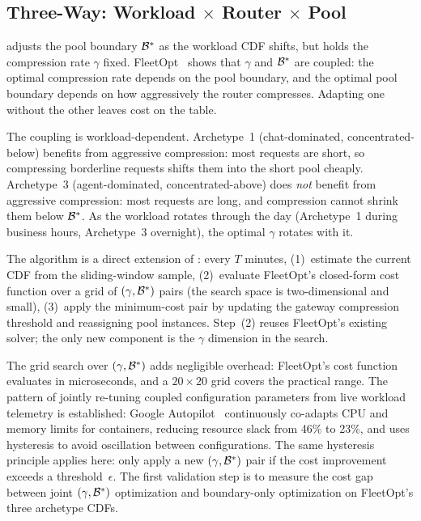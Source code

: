 \subsection{Three-Way: Workload $\times$ Router $\times$ Pool}

\begin{opportunity}
\label{opp:workload-shaping}
 adjusts the pool boundary $\mathcal{B}^*$
as the workload CDF shifts, but holds the compression rate $\gamma$
fixed.  FleetOpt~\cite{fleetopt2026} shows that $\gamma$ and
$\mathcal{B}^*$ are coupled: the optimal compression rate depends on
the pool boundary, and the optimal pool boundary depends on how
aggressively the router compresses.  Adapting one without the other
leaves cost on the table.

The coupling is workload-dependent.  Archetype~1 (chat-dominated,
concentrated-below) benefits from aggressive compression: most
requests are short, so compressing borderline requests shifts them
into the short pool cheaply.  Archetype~3 (agent-dominated,
concentrated-above) does \emph{not} benefit from aggressive
compression: most requests are long, and compression cannot shrink
them below $\mathcal{B}^*$.  As the workload rotates through the
day (Archetype~1 during business hours, Archetype~3 overnight),
the optimal $\gamma$ rotates with it.

The algorithm is a direct extension of :
every $T$ minutes, (1)~estimate the current CDF from the
sliding-window sample, (2)~evaluate FleetOpt's closed-form cost
function over a grid of $(\gamma, \mathcal{B}^*)$ pairs (the search
space is two-dimensional and small), (3)~apply the minimum-cost
pair by updating the gateway compression threshold and reassigning
pool instances.  Step~(2) reuses FleetOpt's existing solver; the
only new component is the $\gamma$ dimension in the search.

\begin{frisk}
The grid search over $(\gamma, \mathcal{B}^*)$ adds negligible
overhead: FleetOpt's cost function evaluates in microseconds, and a
$20 \times 20$ grid covers the practical range.  The pattern of
jointly re-tuning coupled configuration parameters from live
workload telemetry is established: Google
Autopilot~\cite{rzadca2020autopilot} continuously co-adapts CPU
and memory limits for containers, reducing resource slack from
46\% to 23\%, and uses hysteresis to avoid oscillation between
configurations.  The same hysteresis principle applies here: only
apply a new $(\gamma, \mathcal{B}^*)$ pair if the cost improvement
exceeds a threshold~$\epsilon$.  The first validation step is to
measure the cost gap between joint $(\gamma, \mathcal{B}^*)$
optimization and boundary-only optimization on FleetOpt's three
archetype CDFs.
\end{frisk}
\end{opportunity}

